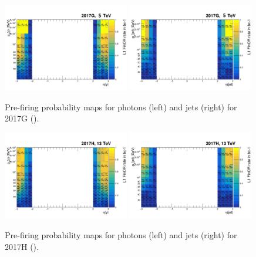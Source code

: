 \begin{figure}[htb]
\centering
\includegraphics[width=0.49\textwidth]{plots/Prefire/L1prefiring_photonpt_2017G.pdf}
\includegraphics[width=0.49\textwidth]{plots/Prefire/L1prefiring_jetpt_2017G.pdf}
\caption{Pre-firing probability maps for photons (left) and jets (right) for 2017G (\serag).}
\label{fig:prefire:2017G}
\end{figure}

\begin{figure}[htb]
\centering
\includegraphics[width=0.49\textwidth]{plots/Prefire/L1prefiring_photonpt_2017H.pdf}
\includegraphics[width=0.49\textwidth]{plots/Prefire/L1prefiring_jetpt_2017H.pdf}
\caption{Pre-firing probability maps for photons (left) and jets (right) for 2017H (\serah). }
\label{fig:prefire:2017H}
\end{figure}